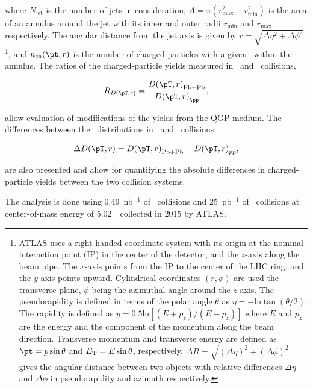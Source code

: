 where $N_{\mathrm{jet}}$ is the number of jets in consideration, $A = \pi (r_{\mathrm{max}}^2 - r_{\mathrm{min}}^2) $ is the area of an annulus around the jet with its inner and outer radii $r_{\mathrm{min}}$ and $r_{\mathrm{max}}$ respectively. The angular distance from the jet axis is given by $r = \sqrt{\Delta \eta^2 + \Delta \phi^2}$ \footnote{ATLAS uses a right-handed coordinate system with its origin at the nominal interaction point (IP) in the center of the detector, and the $z$-axis along the beam pipe. The $x$-axis points from the IP to the center of the LHC ring, and the $y$-axis points upward. Cylindrical coordinates $(r, \phi)$ are used the transverse plane, $\phi$ being the azimuthal angle around the $z$-axis. The pseudorapidity is defined in terms of the polar angle $\theta$ as $\eta = - \text{ln} \tan (\theta/2)$. The rapidity is defined as $y = 0.5\text{ln}[(E + p_z)/(E-p_z)]$ where $E$ and $p_z$ are the energy and the component of the momentum along the beam direction.  Transverse momentum and transverse energy are defined as $\pt = p \sin\theta$ and $\mbox{$E_{\mathrm{T}}$} = E \sin\theta$, respectively. $\Delta R = \sqrt{(\Delta \eta )^2 + (\Delta \phi)^2}$ gives the angular distance between two objects with relative differences $\Delta \eta$ and $\Delta \phi$ in pseudorapidity and azimuth respectively.}, and $n_{\mathrm{ch}}(\pt, r)$ is the number of charged particles with a given \pt\ within the annulus. The ratios of the charged-particle yields measured in \pbpb\ and \pp\ collisions,

\begin{align*}
   \RDptr = \frac{\Dptr_\mathrm{Pb+Pb}}{\Dptr_{\pp}},
\end{align*}

allow evaluation of modifications of the yields from the QGP medium. The differences between the \Dptr\ distributions in \pbpb\ and \pp\ collisions, 

\begin{align*}
   \Delta \Dptr = \Dptr_\mathrm{Pb+Pb} - \Dptr_{pp},
\end{align*}

 are also presented and allow for quantifying the absolute differences in charged-particle yields between the two collision systems. 

The analysis is done using 0.49~nb$^{-1}$ of \pbpb\ collisions and 
25~pb$^{-1}$ of \pp\ collisions at center-of-mass energy of 5.02~\TeV\ collected in 2015 by ATLAS. 


